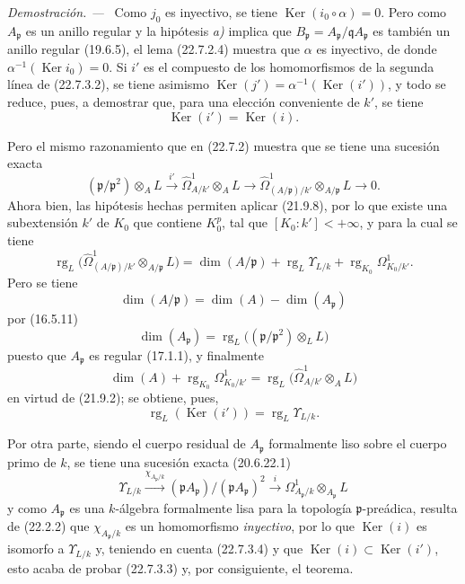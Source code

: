 \documentclass[10pt,oneside]{book}
\newenvironment{proof}{%
  \par\medskip\noindent\textit{Demostración. ---\ }}{\par}
\providecommand{\setmin}{-}%
\begin{document}
\begin{proof}
Como $j_0$ es inyectivo, se tiene $\operatorname{Ker}(i_0\circ\alpha)=0$. Pero como
$A_{\mathfrak p}$ es un anillo regular y la hipótesis \emph{a)} implica que
$B_{\mathfrak p}=A_{\mathfrak p}/\mathfrak qA_{\mathfrak p}$ es también un
anillo regular (19.6.5), el lema (22.7.2.4) muestra que $\alpha$ es inyectivo,
de donde $\alpha^{-1}(\operatorname{Ker} i_0)=0$. Si $i'$ es el compuesto de los homomorfismos de la
segunda línea de (22.7.3.2), se tiene asimismo
$\operatorname{Ker}(j')=\alpha^{-1}(\operatorname{Ker}(i'))$, y todo se reduce, pues, a demostrar que, para una
elección conveniente de $k'$, se tiene
\begin{equation}
\label{0.22.7.3.3-es}
  \operatorname{Ker}(i')=\operatorname{Ker}(i).
  \tag{22.7.3.3}
\end{equation}

Pero el mismo razonamiento que en (22.7.2) muestra que se tiene una sucesión exacta
\[
  (\mathfrak p/\mathfrak p^2)\otimes_AL\xrightarrow{i'}
  \widehat\Omega^1_{A/k'}\otimes_AL\longrightarrow
  \widehat\Omega^1_{(A/\mathfrak p)/k'}\otimes_{A/\mathfrak p}L
  \longrightarrow0.
\]
Ahora bien, las hipótesis hechas permiten aplicar (21.9.8), por lo que existe una
subextensión $k'$ de $K_0$ que contiene $K_0^p$, tal que
$[K_0:k']<+\infty$, y para la cual se tiene
\[
  \operatorname{rg}_L\bigl(\widehat\Omega^1_{(A/\mathfrak p)/k'}
  \otimes_{A/\mathfrak p}L\bigr)
  =\dim(A/\mathfrak p)+\operatorname{rg}_L\Upsilon_{L/k}
  +\operatorname{rg}_{K_0}\Omega^1_{K_0/k'}.
\]
Pero se tiene
\[
  \dim(A/\mathfrak p)=\dim(A)\setmin\dim(A_{\mathfrak p})
\]
por (16.5.11)
\[
  \dim(A_{\mathfrak p})
  =\operatorname{rg}_L\bigl((\mathfrak p/\mathfrak p^2)\otimes_LL\bigr)
\]
puesto que $A_{\mathfrak p}$ es regular (17.1.1), y finalmente
\[
  \dim(A)+\operatorname{rg}_{K_0}\Omega^1_{K_0/k'}
  =\operatorname{rg}_L\bigl(\widehat\Omega^1_{A/k'}\otimes_AL\bigr)
\]
en virtud de (21.9.2); se obtiene, pues,
\begin{equation}
\label{0.22.7.3.4-es}
  \operatorname{rg}_L(\operatorname{Ker}(i'))=\operatorname{rg}_L\Upsilon_{L/k}.
  \tag{22.7.3.4}
\end{equation}

Por otra parte, siendo el cuerpo residual de $A_{\mathfrak p}$ formalmente liso
sobre el cuerpo primo de $k$, se tiene una sucesión exacta (20.6.22.1)
\[
  \Upsilon_{L/k}\xrightarrow{\chi_{A_{\mathfrak p}/k}}
  (\mathfrak pA_{\mathfrak p})/(\mathfrak pA_{\mathfrak p})^2
  \xrightarrow{i}\Omega^1_{A_{\mathfrak p}/k}
  \otimes_{A_{\mathfrak p}}L
\]
y como $A_{\mathfrak p}$ es una $k$-álgebra formalmente lisa para la
topología $\mathfrak p$-preádica, resulta de (22.2.2) que
$\chi_{A_{\mathfrak p}/k}$ es un homomorfismo \emph{inyectivo}, por lo que $\operatorname{Ker}(i)$ es
isomorfo a $\Upsilon_{L/k}$ y, teniendo en cuenta (22.7.3.4) y que
$\operatorname{Ker}(i)\subset\operatorname{Ker}(i')$, esto acaba de probar (22.7.3.3) y, por consiguiente, el
teorema.
\end{proof}
\end{document}
